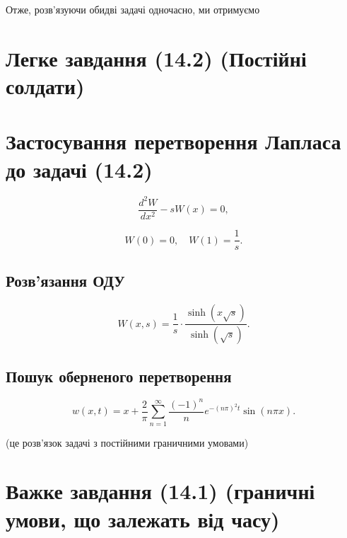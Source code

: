 \documentclass[
  ukrainian,
]{article}
\begin{document}
Отже, розв'язуючи обидві задачі одночасно, ми отримуємо

\section{Легке завдання (14.2) (Постійні
солдати)}\label{ux43bux435ux433ux43aux435-ux437ux430ux432ux434ux430ux43dux43dux44f-14.2-ux43fux43eux441ux442ux456ux439ux43dux456-ux441ux43eux43bux434ux430ux442ux438}

\section{Застосування перетворення Лапласа до задачі
(14.2)}\label{ux437ux430ux441ux442ux43eux441ux443ux432ux430ux43dux43dux44f-ux43fux435ux440ux435ux442ux432ux43eux440ux435ux43dux43dux44f-ux43bux430ux43fux43bux430ux441ux430-ux434ux43e-ux437ux430ux434ux430ux447ux456-14.2}

\[
\frac{d^2 W}{dx^2} - s W(x) = 0,
\]

\[
W(0) = 0, \quad W(1) = \frac{1}{s}.
\]

\subsection{Розв'язання
ОДУ}\label{ux440ux43eux437ux432ux44fux437ux430ux43dux43dux44f-ux43eux434ux443}

\[
W(x, s) = \frac{1}{s} \cdot \frac{\sinh(x \sqrt{s})}{\sinh(\sqrt{s})}.
\]

\subsection{Пошук оберненого
перетворення}\label{ux43fux43eux448ux443ux43a-ux43eux431ux435ux440ux43dux435ux43dux43eux433ux43e-ux43fux435ux440ux435ux442ux432ux43eux440ux435ux43dux43dux44f}

\[
w(x, t) = x + \frac{2}{\pi} \sum_{n=1}^{\infty} \frac{(-1)^n}{n} e^{-(n\pi)^2 t} \sin(n\pi x).
\]

(це розв'язок задачі з постійними граничними умовами)

\section{Важке завдання (14.1) (граничні умови, що залежать від
часу)}\label{ux432ux430ux436ux43aux435-ux437ux430ux432ux434ux430ux43dux43dux44f-14.1-ux433ux440ux430ux43dux438ux447ux43dux456-ux443ux43cux43eux432ux438-ux449ux43e-ux437ux430ux43bux435ux436ux430ux442ux44c-ux432ux456ux434-ux447ux430ux441ux443}
\end{document}
